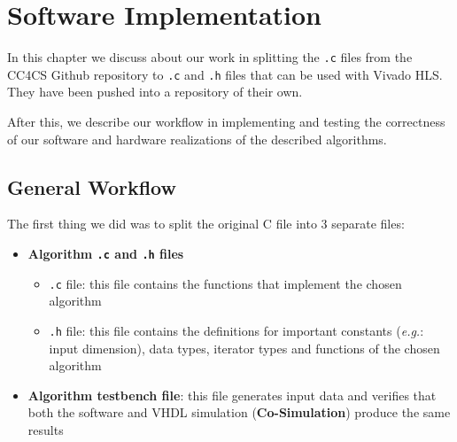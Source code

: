 \chapter{Software Implementation}
\label{chapter:software}
In this chapter we discuss about our work in splitting the \texttt{.c} files from the CC4CS Github repository\cite{cc4cs_git} to \texttt{.c} and \texttt{.h} files that can be used with Vivado HLS. They have been pushed into a repository of their own\cite{repo_our_files}.

After this, we describe our workflow in implementing and testing the correctness of our software and hardware realizations of the described algorithms.

\section{General Workflow}

The first thing we did was to split the original C file into 3 separate files:

\begin{itemize}[noitemsep]
	\item \textbf{Algorithm \texttt{.c} and \texttt{.h} files}
	\begin{itemize}[noitemsep]
		\item \texttt{.c} file: this file contains the functions that implement the chosen algorithm
		\item \texttt{.h} file: this file contains the definitions for important constants (\textit{e.g.}: input dimension), data types, iterator types and functions of the chosen algorithm
	\end{itemize}
	\item \textbf{Algorithm testbench file}: this file generates input data and verifies that both the software and VHDL simulation (\textbf{Co-Simulation}) produce the same results
\end{itemize}


